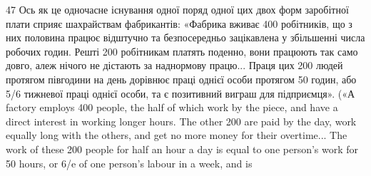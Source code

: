 47    Ось як це одночасне існування одної поряд одної цих двох форм
заробітної плати сприяє шахрайствам фабрикантів: «Фабрика вживає
400 робітників, що з них половина працює відштучно та безпосередньо
зацікавлена у збільшенні числа робочих годин. Решті 200 робітникам
платять поденно, вони працюють так само довго, алеж нічого не дістають
за наднормову працю... Праця цих 200 людей протягом півгодини
на день дорівнює праці однієї особи протягом 50 годин, або 5/6 тижневої
праці однієї особи, та є позитивний виграш для підприємця». («А factory
employs 400 people, the half of which work by the piece, and have a direct
interest in working longer hours. The other 200 are paid by the day,
work equally long with the others, and get no more money for their overtime...
The work of these 200 people for half an hour a day is equal to one
person’s work for 50 hours, or 6/e of one person’s labour in a week, and is
